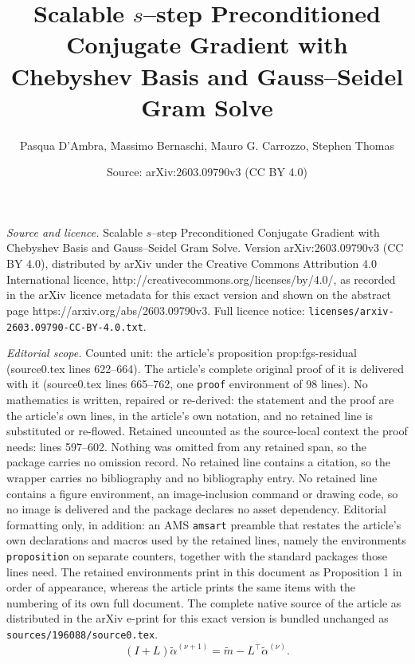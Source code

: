 \documentclass[10pt,a4paper]{amsart}
\title{Scalable $s$--step Preconditioned Conjugate Gradient with Chebyshev Basis and Gauss--Seidel Gram Solve}
\author{Pasqua D'Ambra, Massimo Bernaschi, Mauro G. Carrozzo, Stephen Thomas}
\date{Source: arXiv:2603.09790v3 (CC BY 4.0)}
\begin{document}
\maketitle

\noindent\emph{Source and licence.} Scalable $s$--step Preconditioned Conjugate Gradient with Chebyshev Basis and Gauss--Seidel Gram Solve. Version arXiv:2603.09790v3 (CC BY 4.0), distributed by arXiv under the Creative Commons Attribution 4.0 International licence, http://creativecommons.org/licenses/by/4.0/, as recorded in the arXiv licence metadata for this exact version and shown on the abstract page https://arxiv.org/abs/2603.09790v3. Full licence notice: \texttt{licenses/arxiv-2603.09790-CC-BY-4.0.txt}.\par\smallskip

\noindent\textit{Editorial scope.} Counted unit: the article's proposition prop:fgs-residual (source0.tex lines 622--664). The article's complete original proof of it is delivered with it (source0.tex lines 665--762, one \texttt{proof} environment of 98 lines). No mathematics is written, repaired or re-derived: the statement and the proof are the article's own lines, in the article's own notation, and no retained line is substituted or re-flowed.  Retained uncounted as the source-local context the proof needs: lines 597--602.  Nothing was omitted from any retained span, so the package carries no omission record.  No retained line contains a citation, so the wrapper carries no bibliography and no bibliography entry.  No retained line contains a figure environment, an image-inclusion command or drawing code, so no image is delivered and the package declares no asset dependency.  Editorial formatting only, in addition: an AMS \texttt{amsart} preamble that restates the article's own declarations and macros used by the retained lines, namely the environments \texttt{proposition} on separate counters, together with the standard packages those lines need.  The retained environments print in this document as Proposition 1 in order of appearance, whereas the article prints the same items with the numbering of its own full document.  The complete native source of the article as distributed in the arXiv e-print for this exact version is bundled unchanged as \texttt{sources/196088/source0.tex}.
\begin{equation}
\label{eq:fgs-iteration}
(I+L)\widetilde{\alpha}^{(\nu+1)}
=
\widetilde{m}-L^\top\widetilde{\alpha}^{(\nu)}.
\end{equation}
\end{document}
